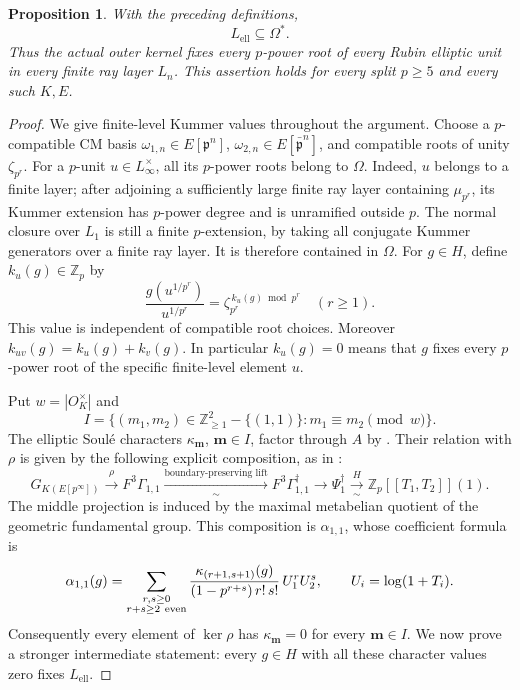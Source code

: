 \documentclass[11pt]{article}
\newtheorem{proposition}[theorem]{Proposition}
\theoremstyle{definition}\newtheorem{definition}[theorem]{Definition}
\begin{document}
\begin{proposition}\label{prop:cm-full-radical}
With the preceding definitions,
\[
             L_{\mathrm{ell}}\subseteq\Omega^*.
\]
Thus the actual outer kernel fixes every \(p\)-power root of every
Rubin elliptic unit in every finite ray layer \(L_n\).
This assertion holds for every split \(p\geq5\) and every such \(K,E\).
\end{proposition}

\begin{proof}
We give finite-level Kummer values throughout the argument.
Choose a \(p\)-compatible CM basis
\(\omega_{1,n}\in E[\mathfrak p^n]\),
\(\omega_{2,n}\in E[\bar{\mathfrak p}^n]\), and compatible
roots of unity \(\zeta_{p^r}\).
For a \(p\)-unit \(u\in L_\infty^\times\), all its \(p\)-power roots
belong to \(\Omega\).
Indeed, \(u\) belongs to a finite layer; after adjoining a sufficiently
large finite ray layer containing \(\mu_{p^r}\), its Kummer extension
has \(p\)-power degree and is unramified outside \(p\).
The normal closure over \(L_1\) is still a finite \(p\)-extension,
by taking all conjugate Kummer generators over a finite ray layer.
It is therefore contained in \(\Omega\).
For \(g\in H\), define \(k_u(g)\in\mathbb Z_p\) by
\[
 \frac{g(u^{1/p^r})}{u^{1/p^r}}
             =\zeta_{p^r}^{\,k_u(g)\bmod p^r}\quad(r\geq1).
\]
This value is independent of compatible root choices.
Moreover \(k_{uv}(g)=k_u(g)+k_v(g)\).
In particular \(k_u(g)=0\) means that \(g\) fixes every
\(p\)-power root of the specific finite-level element \(u\).

Put \(w=|O_K^\times|\) and
\[
 I=\{(m_1,m_2)\in\mathbb Z_{\geq1}^2-\{(1,1)\}:
                      m_1\equiv m_2\pmod w\}.
\]
The elliptic Soul\'e characters \(\kappa_{\boldsymbol m}\),
\(\boldsymbol m\in I\), factor through \(A\)
by \cite[Lemma 4.1, p.~16]{IshiiSoule}.
Their relation with \(\rho\) is given by the following explicit
composition, as in
\cite[Definition 2.5 and Theorem 2.6, p.~8]{Ishii}:
\[
 G_{K(E[p^\infty])}
 \xrightarrow{\rho}F^3\Gamma_{1,1}
 \xrightarrow[\sim]{\text{boundary-preserving lift}}
 F^3\Gamma_{1,1}^{\dagger}
 \longrightarrow\Psi_1^\dagger
 \xrightarrow[\sim]{H}
       \mathbb Z_p[[T_1,T_2]](1).
\]
The middle projection is induced by the maximal metabelian quotient
of the geometric fundamental group.
This composition is \(\alpha_{1,1}\), whose coefficient formula is
\begin{equation}\label{eq:cm-radical-geometric-moments}
 \alpha_{1,1}(g)=
 \sum_{\substack{r,s\geq0\\ r+s\geq2\ {\rm even}}}
 \frac{\kappa_{(r+1,s+1)}(g)}
      {(1-p^{r+s})\,r!\,s!}\,U_1^rU_2^s,\qquad
 U_i=\log(1+T_i).
\end{equation}
Consequently every element of \(\ker\rho\) has
\(\kappa_{\boldsymbol m}=0\) for every \(\boldsymbol m\in I\).
We now prove a stronger intermediate statement: every \(g\in H\)
with all these character values zero fixes \(L_{\mathrm{ell}}\).


\end{proof}
\end{document}
